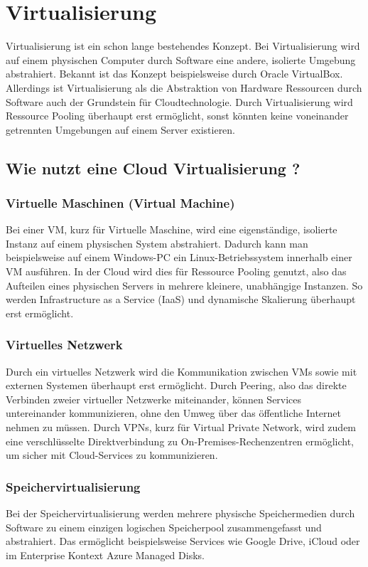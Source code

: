 \section{Virtualisierung}
Virtualisierung ist ein schon lange bestehendes Konzept. Bei Virtualisierung
wird auf einem physischen Computer durch Software eine andere, isolierte
Umgebung abstrahiert. Bekannt ist das Konzept beispielsweise durch Oracle
VirtualBox. Allerdings ist Virtualisierung als die Abstraktion von
Hardware Ressourcen durch Software auch der Grundstein für Cloudtechnologie.
Durch Virtualisierung wird Ressource Pooling überhaupt erst ermöglicht, sonst
könnten keine voneinander getrennten Umgebungen auf einem Server existieren.
\subsection{Wie nutzt eine Cloud Virtualisierung ?}
\subsubsection{Virtuelle Maschinen (Virtual Machine)}
Bei einer VM, kurz für Virtuelle Maschine, wird eine eigenständige,
isolierte Instanz auf einem physischen System abstrahiert. Dadurch kann man
beispielsweise auf einem Windows-PC ein Linux-Betriebssystem innerhalb einer
VM ausführen. In der Cloud wird dies für Ressource Pooling genutzt, also das
Aufteilen eines physischen Servers in mehrere kleinere, unabhängige Instanzen.
So werden Infrastructure as a Service (IaaS) und dynamische Skalierung
überhaupt erst ermöglicht.
\subsubsection{Virtuelles Netzwerk}
Durch ein virtuelles Netzwerk wird die Kommunikation zwischen VMs sowie
mit externen Systemen überhaupt erst ermöglicht. Durch Peering, also das
direkte Verbinden zweier virtueller Netzwerke miteinander, können Services
untereinander kommunizieren, ohne den Umweg über das öffentliche Internet
nehmen zu müssen. Durch VPNs, kurz für Virtual Private Network, wird zudem
eine verschlüsselte Direktverbindung zu On-Premises-Rechenzentren ermöglicht,
um sicher mit Cloud-Services zu kommunizieren.
\subsubsection{Speichervirtualisierung}
Bei der Speichervirtualisierung werden mehrere physische Speichermedien durch
Software zu einem einzigen logischen Speicherpool zusammengefasst und
abstrahiert. Das ermöglicht beispielsweise Services wie Google Drive, iCloud oder im Enterprise Kontext Azure Managed Disks.

